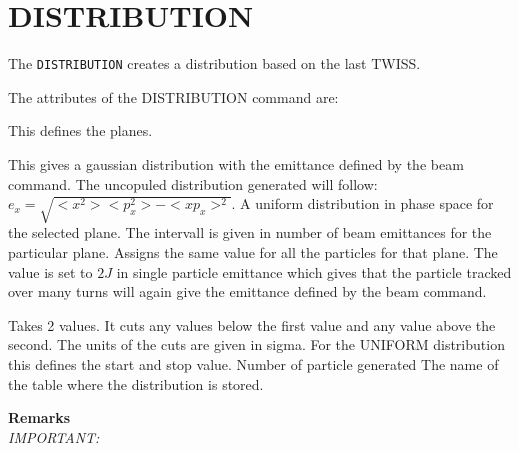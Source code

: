 \section{DISTRIBUTION}
\label{sec:track}

The \texttt{DISTRIBUTION} creates a distribution based on the last TWISS.  



The attributes of the DISTRIBUTION command are:

\begin{madlist}  
 This defines the planes.
	\begin{madlist}  
     This gives a gaussian distribution with the emittance defined
    by the beam command. The uncopuled distribution generated will follow:
    $e_x = \sqrt{<x^2><p_x^2>-<xp_x>^2}$.  
     A uniform distribution in phase space for the selected plane.
    The intervall is given in number of beam emittances for the particular plane. 
     Assigns the same value for all the particles for that plane. 
    The value is set to $2J$ in single particle emittance which gives that the particle
    tracked over many turns will again give the emittance defined by the beam command. 
  \end{madlist}
 Takes 2 values. It cuts any values below the first value and any value above the second. 
The units of the cuts are given in sigma. For the UNIFORM distribution this defines the start and stop value.   
 Number of particle generated
 The name of the table where the distribution is stored.
\end{madlist}

\textbf{Remarks}\\
\emph{IMPORTANT:} 